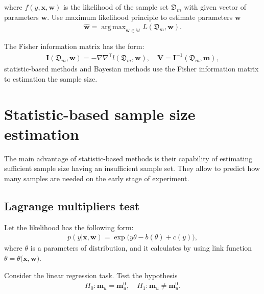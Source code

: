 \documentclass[
11pt,%
tightenlines,%
twoside,%
onecolumn,%
nofloats,%
nobibnotes,%
nofootinbib,%
superscriptaddress,%
noshowpacs,%
centertags]%
{revtex4}
\DeclareMathOperator*{\argmax}{arg\,max}
\begin{document}
where $f(y,\textbf{x}, \textbf{w})$ is the likelihood of the sample set $\mathfrak{D}_{m}$ with given vector of parameters $\textbf{w}$.
Use maximum likelihood principle to estimate parameters $\textbf{w}$
\begin{equation}
\label{eq:ps:5}
\begin{aligned}
	\hat{\textbf{w}} = \argmax_{\textbf{w}\in\mathbb{W}}L\left(\mathfrak{D}_{m}, \textbf{w}\right).
\end{aligned}
\end{equation}

The Fisher information matrix has the form:
\begin{equation}
\label{eq:ps:6}
\begin{aligned}
	\textbf{I}\left(\mathfrak{D}_{m}, \textbf{w}\right) = -\nabla\nabla^{\mathsf{T}}l\left(\mathfrak{D}_{m}, \textbf{w}\right), \quad  \textbf{V} = \textbf{I}^{-1}\left(\mathfrak{D}_{m}, \textbf{m}\right),
\end{aligned}
\end{equation}
statistic-based methods and Bayesian methods use the Fisher information matrix to estimation the sample size.

\section{Statistic-based sample size estimation}
The main advantage of statistic-based methods is their capability of estimating sufficient sample size having an insufficient sample set. They allow to predict how many samples are needed on the early stage of experiment.

\subsection{Lagrange multipliers test}
Let the likelihood has the following form:
\begin{equation}
\label{eq:sb:1}
\begin{aligned}
	p(y|\mathbf{x}, \mathbf{w}) = \exp\bigl(y\theta- b(\theta) + c\left(y\right)\bigr),
\end{aligned}
\end{equation}
where $\theta$ is a parameters of distribution, and it calculates by using link function $\theta=\theta\bigr(\mathbf{x}, \mathbf{w}\bigr).$

Consider the linear regression task. Test the hypothesis
\begin{equation}
\label{eq:sb:2}
\begin{aligned}
	H_0: \textbf{m}_{u} = \textbf{m}^0_{u}, \quad H_1: \textbf{m}_{u} \not= \textbf{m}^0_{u}.
\end{aligned}
\end{equation}
\end{document}
